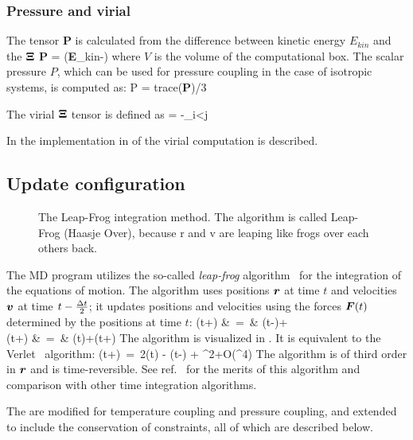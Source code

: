 \subsubsection{Pressure and virial}
The  
tensor {\bf P} is calculated from the difference between 
kinetic energy $E_{kin}$ and the  ${\bf \Xi}$
\beq
{\bf P} =  ({\bf E}_{kin}-{\bf \Xi})
\label{eqn:P}
\eeq
where $V$ is the volume of the computational box. 
The scalar pressure $P$, which can be used for pressure coupling in the case
of isotropic systems, is computed as:
\beq
P       = {\rm trace}({\bf P})/3
\eeq

The virial ${\bf \Xi}$ tensor is defined as 
\beq
{\bf \Xi} = -\half \sum_{i<j} \rvij \otimes \Fvij 
\label{eqn:Xi}
\eeq

In  the
implementation  in {\gromacs} of the virial computation is described.

\subsection{Update configuration}
\label{subsec:update}
\begin{figure}
\centerline{}
\caption[The Leap-Frog integration method.]{The Leap-Frog integration method. The algorithm is called
Leap-Frog  (Haasje Over), because r and v are leaping
like  frogs over each others back.}
\label{fig:leapfrog}
\end{figure}

The {\gromacs} MD program utilizes the so-called {\em leap-frog} 
algorithm~\cite{Hockney74} for the integration of the equations of
motion.  The  
algorithm uses positions $\mbox{\boldmath ${r}$}$ at time $t$ and
velocities $\mbox{\boldmath ${v}$}$ at time $t-{\frac {\Delta t}{2}}$; it updates positions and
velocities using the forces
$\mbox{\boldmath ${F}$}(t)$ determined by the positions at time $t$: 
\bea
{}(t+\hDt)  &~=~&   (t-\hDt)+\Dt   \\
(t+\Dt)   &~=~&   (t)+(t+\hDt)\Dt
\eea
The algorithm is visualized in .
It is equivalent to the Verlet~\cite{Verlet67} algorithm:
\beq
{}(t+\Dt)~=~2(t) - (t-\Dt) + \Dt^2+O(\Dt^4)
\eeq
The algorithm is of third order in $\mbox{\boldmath ${r}$}$ and is time-reversible.
See ref.~\cite{Berendsen86b} for the merits of this algorithm and comparison
with other time integration algorithms.
 
The  are modified for temperature coupling
 and pressure coupling, and extended to include the conservation of
constraints, all of which are described below.

